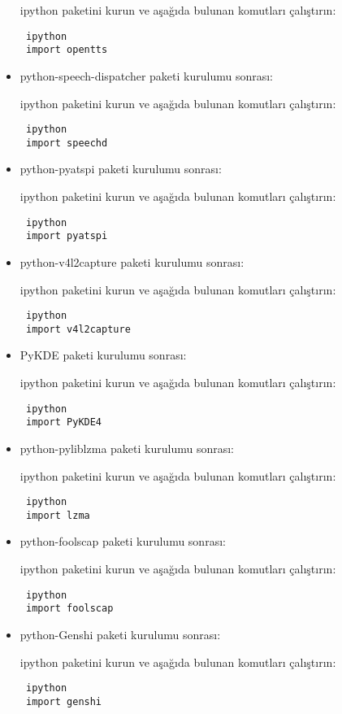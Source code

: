 \documentclass[a4paper,10pt]{article}
\begin{document}
\begin{itemize}
ipython paketini kurun ve aşağıda bulunan komutları çalıştırın:
\begin{verbatim}
 ipython
 import opentts
\end{verbatim}

\item python-speech-dispatcher paketi kurulumu sonrası:

ipython paketini kurun ve aşağıda bulunan komutları çalıştırın:
\begin{verbatim}
 ipython
 import speechd
\end{verbatim}

\item python-pyatspi paketi kurulumu sonrası:

ipython paketini kurun ve aşağıda bulunan komutları çalıştırın:
\begin{verbatim}
 ipython
 import pyatspi
\end{verbatim}

\item python-v4l2capture paketi kurulumu sonrası:

ipython paketini kurun ve aşağıda bulunan komutları çalıştırın:
\begin{verbatim}
 ipython
 import v4l2capture
\end{verbatim}

\item PyKDE paketi kurulumu sonrası:

ipython paketini kurun ve aşağıda bulunan komutları çalıştırın:
\begin{verbatim}
 ipython
 import PyKDE4
\end{verbatim}

\item python-pyliblzma paketi kurulumu sonrası:

ipython paketini kurun ve aşağıda bulunan komutları çalıştırın:
\begin{verbatim}
 ipython
 import lzma
\end{verbatim}

\item python-foolscap paketi kurulumu sonrası:

ipython paketini kurun ve aşağıda bulunan komutları çalıştırın:
\begin{verbatim}
 ipython
 import foolscap
\end{verbatim}

\item python-Genshi paketi kurulumu sonrası:

ipython paketini kurun ve aşağıda bulunan komutları çalıştırın:
\begin{verbatim}
 ipython
 import genshi
\end{verbatim}


\end{itemize}
\end{document}
